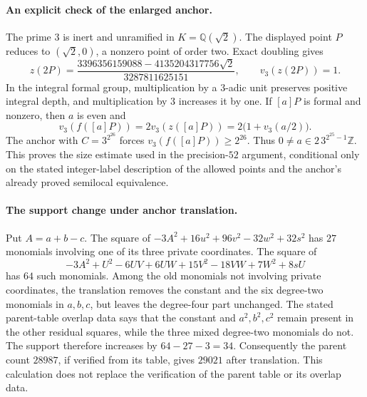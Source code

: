 \paragraph{An explicit check of the enlarged anchor.}
The prime $3$ is inert and unramified in $K=\mathbb Q(\sqrt2)$.
The displayed point $P$ reduces to $(\sqrt2,0)$, a nonzero point of
order two. Exact doubling gives
\[
 z(2P)=\frac{3396356159088-4135204317756\sqrt2}{3287811625151},
 \qquad v_3(z(2P))=1.
\]
In the integral formal group, multiplication by a $3$-adic unit
preserves positive integral depth, and multiplication by $3$ increases
it by one. If $[a]P$ is formal and nonzero, then $a$ is even and
\[
 v_3(f([a]P))=2v_3(z([a]P))=2\bigl(1+v_3(a/2)\bigr).
\]
The anchor with $C=3^{2^{26}}$ forces
$v_3(f([a]P))\ge2^{26}$. Thus
$0\ne a\in2\,3^{2^{25}-1}\mathbb Z$.
This proves the size estimate used in the precision-$52$ argument,
conditional only on the stated integer-label description of the
allowed points and the anchor's already proved semilocal equivalence.

\paragraph{The support change under anchor translation.}
Put $A=a+b-c$. The square of
$-3A^2+16u^2+96v^2-32w^2+32s^2$ has $27$ monomials involving
one of its three private coordinates. The square of
\[
 -3A^2+U^2-6UV+6UW+15V^2-18VW+7W^2+8sU
\]
has $64$ such monomials. Among the old monomials not involving
private coordinates, the translation removes the constant and the
six degree-two monomials in $a,b,c$, but leaves the degree-four
part unchanged. The stated parent-table overlap data says that the
constant and $a^2,b^2,c^2$ remain present in the other residual
squares, while the three mixed degree-two monomials do not.
The support therefore increases by $64-27-3=34$.
Consequently the parent count $28987$, if verified from its table,
gives $29021$ after translation. This calculation does not replace
the verification of the parent table or its overlap data.
